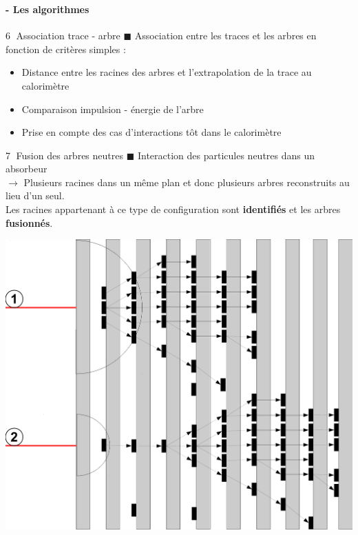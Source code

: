 \documentclass[8pt]{beamer}
\begin{document}
  \begin{frame}
  \frametitle{\secname}
  \framesubtitle{\subsecname - Les algorithmes}
    \begin{minipage}{0.55\linewidth}
      \begin{block}{\textcircled{{\small 6}} Association trace - arbre}
        $\blacksquare$ Association entre les traces et les arbres en fonction de critères simples :
        \begin{itemize}
          \item Distance entre les racines des arbres et l'extrapolation de la trace au calorimètre
          \item Comparaison impulsion - énergie de l'arbre
          \item Prise en compte des cas d'interactions tôt dans le calorimètre
        \end{itemize}
      \end{block}
      \begin{block}{\textcircled{{\small 7}} Fusion des arbres neutres}
        $\blacksquare$ Interaction des particules neutres dans un absorbeur \\
        $\rightarrow$ Plusieurs racines dans un même plan et donc plusieurs arbres reconstruits au lieu d'un seul. \\
        Les racines appartenant à ce type de configuration sont \textbf{identifiés} et les arbres \textbf{fusionnés}.  
      \end{block}
    \end{minipage} \hfill
    \begin{minipage}{0.44\linewidth}
      \begin{center}
        \includegraphics[width=0.9\linewidth]{EnergyDrivenTrackClusterAssociation.pdf} \\

\end{center}
\end{minipage}
\end{frame}
\end{document}
